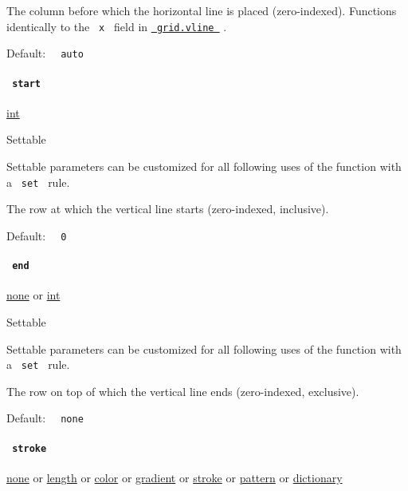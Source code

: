 The column before which the horizontal line is placed (zero-indexed).
Functions identically to the \texttt{\ x\ } field in
\href{/docs/reference/layout/grid/\#definitions-vline}{\texttt{\ grid.vline\ }}
.

Default: \texttt{\ }{\texttt{\ auto\ }}\texttt{\ }

\paragraph{\texorpdfstring{\texttt{\ start\ }}{ start }}\label{definitions-vline-start}

\href{/docs/reference/foundations/int/}{int}

{{ Settable }}

\label{definitions-vline-start-settable-tooltip}
Settable parameters can be customized for all following uses of the
function with a \texttt{\ set\ } rule.

The row at which the vertical line starts (zero-indexed, inclusive).

Default: \texttt{\ }{\texttt{\ 0\ }}\texttt{\ }

\paragraph{\texorpdfstring{\texttt{\ end\ }}{ end }}\label{definitions-vline-end}

\href{/docs/reference/foundations/none/}{none} {or}
\href{/docs/reference/foundations/int/}{int}

{{ Settable }}

\label{definitions-vline-end-settable-tooltip}
Settable parameters can be customized for all following uses of the
function with a \texttt{\ set\ } rule.

The row on top of which the vertical line ends (zero-indexed,
exclusive).

Default: \texttt{\ }{\texttt{\ none\ }}\texttt{\ }

\paragraph{\texorpdfstring{\texttt{\ stroke\ }}{ stroke }}\label{definitions-vline-stroke}

\href{/docs/reference/foundations/none/}{none} {or}
\href{/docs/reference/layout/length/}{length} {or}
\href{/docs/reference/visualize/color/}{color} {or}
\href{/docs/reference/visualize/gradient/}{gradient} {or}
\href{/docs/reference/visualize/stroke/}{stroke} {or}
\href{/docs/reference/visualize/pattern/}{pattern} {or}
\href{/docs/reference/foundations/dictionary/}{dictionary}

